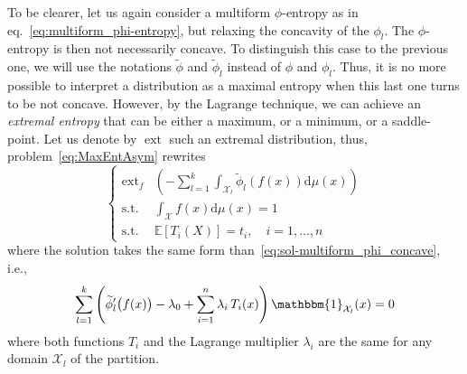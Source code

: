 \documentclass[english,sort&compress]{elsarticle}
\theoremstyle{definition}
\theoremstyle{plain}
\theoremstyle{plain}
\def\dmu{\mathrm{d}\mu}
\def\X{\mathcal{X}}
\def\un{\mathbbm{1}}
\def\ext{\operatorname{ext}}
\newcommand{\Esp}[1]{\mathbb{E}\left[ #1 \right]}
\begin{document}
To  be  clearer,  let  us  again  consider  a  multiform  $\phi$-entropy  as  in
eq.~\eqref{eq:multiform_phi-entropy},   but  relaxing   the  concavity   of  the
$\phi_l$. The  $\phi$-entropy is then  not necessarily concave.   To distinguish
this case to the previous one,  we will use the notations $\widetilde{\phi}$ and
$\widetilde{\phi}_l$  instead of  $\phi$  and  $\phi_l$.  Thus,  it  is no  more
possible to  interpret a distribution  as a maximal  entropy when this  last one
turns to be  not concave. However, by the Lagrange technique,  we can achieve an
{\em  extremal entropy}  that  can  be either  a  maximum, or  a  minimum, or  a
saddle-point.  Let us  denote by  $\ext$  such an  extremal distribution,  thus,
problem~\ref{eq:MaxEntAsym} rewrites
%
\begin{equation}\label{eq:ExtEntMulti}
\begin{cases}
\ext_f & \displaystyle \left( - \sum_{l=1}^k \int_{\X_l}
\widetilde{\phi}_l(f(x)) \dmu(x) \right)
\\[7.5mm]
\text{s.t. } & {\displaystyle \int_\X f(x) \dmu(x) = 1}\\[5mm]
\text{s.t. } & \Esp{T_i(X)} = t_i , \quad i = 1 , \ldots , n
\end{cases}
\end{equation}
%
where        the        solution        takes        the        same        form
than~\eqref{eq:sol-multiform_phi_concave}, i.e.,
%
\begin{equation}\label{eq:sol-multiform_phi_notconcave}
\sum_{l=1}^k \left( \widetilde{\phi}_l'\big(f(x)\big) - \lambda_0 +
\sum_{i=1}^n \lambda_i \, T_i(x) \right) \un_{\X_l}(x) = 0
\end{equation}
%
where both functions $T_i$ and  the Lagrange multiplier $\lambda_i$ are the same
for any domain $\X_l$ of the partition.
\end{document}

